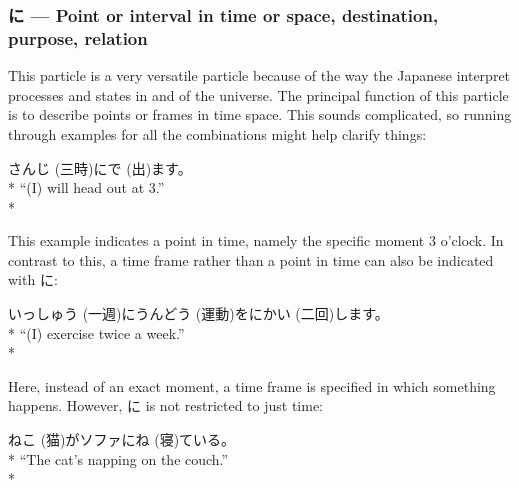 \documentclass[11pt, b5paper, twoside, openright, onecolumn]{book}
\makeatletter
\newcommand*{\rubystack}[2]{{\relscale{0.5}%
  \begin{tabular}[b]{@{}c@{}}%
    {#1}\\%
   {\textscale{2}{#2}}%
  \end{tabular}}%
}
\DeclareRobustCommand*{\ruby}[2]{%
  \mbox{%
    \setlength{\parskip}{0ex}%
    \BeginAccSupp{method=pdfstringdef,ActualText={#1}}%
      \rubystack{\phantom{#2}}{#1}%
      \llap{%
        \rubystack{#2}{\phantom{#1}}%
      }%
    \EndAccSupp{}%
  }%
}
\renewcommand*{\ruby}[2]{#2 (#1)}%
\newenvironment{exampleblock}{
\setlength{\parindent}{0.6in}
\begin{minipage}[t]{\dimexpr\textwidth-\parindent}}
{\end{minipage}}
\makeatother
\begin{document}
\subsubsection{に — Point or interval in time or space‚ destination‚ purpose‚ relation}

This particle is a very versatile particle because of the way the Japanese interpret processes and states in and of the universe. The principal function of this particle is to describe points or frames in time space. This sounds complicated‚ so running through examples for all the combinations might help clarify things:

\vspace{0.4cm}
\begin{exampleblock}
\ruby{三時}{さんじ}に\ruby{出}{で}ます。 \\* 
“(I) will head out at 3.” \\* 
\end{exampleblock}
\vspace{0.2cm}

This example indicates a point in time‚ namely the specific moment 3 o’clock. In contrast to this‚ a time frame rather than a point in time can also be indicated with に:

\vspace{0.4cm}
\begin{exampleblock}
\ruby{一週}{いっしゅう}に\ruby{運動}{うんどう}を\ruby{二回}{にかい}します。 \\* 
“(I) exercise twice a week.” \\* 
\end{exampleblock}
\vspace{0.2cm}

Here‚ instead of an exact moment‚ a time frame is specified in which something happens. However‚ に is not restricted to just time:

\vspace{0.4cm}
\begin{exampleblock}
\ruby{猫}{ねこ}がソファに\ruby{寝}{ね}ている。 \\* 
“The cat’s napping on the couch.” \\* 
\end{exampleblock}
\vspace{0.2cm}
\end{document}
